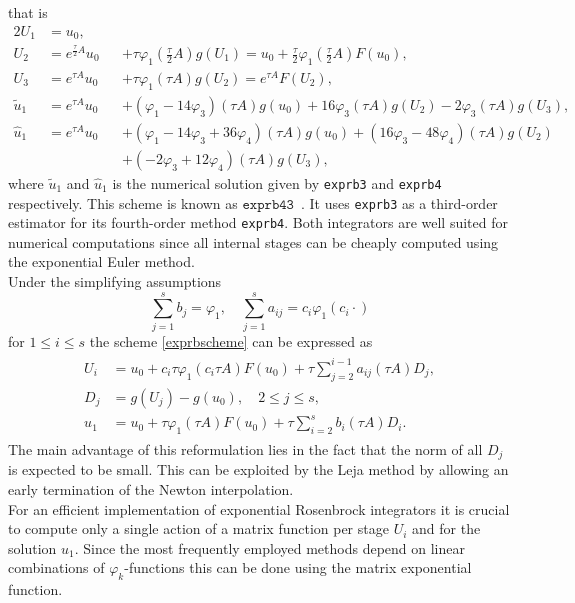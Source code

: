 \documentclass{scrartcl}
\begin{document}
	\noindent that is 
	\begin{alignat*}{2}
	U_{1} &= u_0,\\
	U_{2} &= e^{\frac{\tau}{2} A}u_0 &&+ \tau\varphi_1\left(\frac{\tau}{2} A\right)g(U_1) = u_0 + \frac{\tau}{2}\varphi_1\left(\frac{\tau}{2}A\right)F(u_0),\\
	U_{3} &= e^{\tau A}u_0 &&+ \tau\varphi_1(\tau A)g(U_2) = e^{\tau A}F(U_2),\\
	\tilde{u}_1 &= e^{\tau A}u_0 &&+ (\varphi_1 - 14\varphi_3)(\tau A)g(u_0) + 16\varphi_3(\tau A)g(U_2) - 2\varphi_3(\tau A)g(U_3),\\
	\hat{u}_1 &= e^{\tau A}u_0 &&+ (\varphi_1 - 14\varphi_3 + 36\varphi_4)(\tau A)g(u_0) + (16\varphi_3 -48\varphi_4)(\tau A)g(U_2) \\
	& &&+ (-2\varphi_3 + 12\varphi_4)(\tau A)g(U_3),
	\end{alignat*}
	where $\tilde{u}_1$ and $\hat{u}_1$ is the numerical solution given by \texttt{exprb3} and \texttt{exprb4} respectively.
	\noindent This scheme is known as $\texttt{exprb43}$~\cite[Example 2.24]{bible}. It uses \texttt{exprb3} as a third-order estimator for its fourth-order method \texttt{exprb4}. Both integrators are well suited for numerical computations since all internal stages can be cheaply computed using the exponential Euler method. \\
	Under the simplifying assumptions
	\[
	\sum_{j=1}^s b_j = \varphi_1, \quad  \sum_{j=1}^s a_{ij} = c_i\varphi_1(c_i\cdot) 
	\]
	for $1\le i\le s$ the scheme \eqref{exprbscheme} can be expressed as 
	\begin{align}
	\begin{split}
	U_i &= u_0 + c_i\tau\varphi_1(c_i \tau A)F(u_0) + \tau\sum_{j=2}^{i-1}a_{ij}(\tau A)D_j, \\
	D_j &= g(U_j) - g(u_0), \quad 2\le j\le s, \\
	u_1 &= u_0 +    \tau\varphi_1(    \tau A)F(u_0) + \tau\sum_{i=2}^{s}     b_i(\tau A)D_i.
	\end{split}\label{eq:Djscheme}
	\end{align}
	The main advantage of this reformulation lies in the fact that the norm of all $D_j$ is expected to be small. This can be exploited by the Leja method by allowing an early termination of the Newton interpolation. \\
	For an efficient implementation of exponential Rosenbrock integrators it is crucial to compute only a single action of a matrix function per stage $U_i$ and for the solution $u_1$. Since the most frequently employed methods depend on linear combinations of $\varphi_k$-functions this can be done using the matrix exponential function.
	
\end{document}
